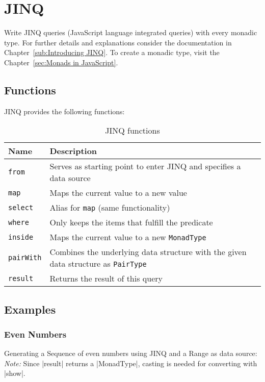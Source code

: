 \section{JINQ} %
\label{sec:API_JINQ}
Write JINQ queries (JavaScript language integrated queries) with every monadic type.
\newline
For further details and explanations consider the documentation in
Chapter~\ref{sub:Introducing JINQ}.
\newline
To create a monadic type, visit the Chapter~\ref{sec:Monads in JavaScript}.


\subsection{Functions}
\label{sub:JINQ_Functions}
JINQ provides the following functions:

\begin{table}[H]
  \centering
  \begin{tabularx}{\textwidth}{| l | X |} \hline
    \textbf{Name}       & \textbf{Description} \\ \hline
    \texttt{from}       & Serves as starting point to enter JINQ and specifies a data source \\ \hline 
    \texttt{map}        & Maps the current value to a new value \\ \hline 
    \texttt{select}     & Alias for \texttt{map} (same functionality) \\ \hline 
    \texttt{where}      & Only keeps the items that fulfill the predicate \\ \hline 
    \texttt{inside}     & Maps the current value to a new \texttt{MonadType} \\ \hline 
    \texttt{pairWith}   & Combines the underlying data structure with the given data structure as \texttt{PairType} \\ \hline 
    \texttt{result}     & Returns the result of this query\\ \hline 

  \end{tabularx}
  \caption{JINQ functions}
  \label{tab:jinq_functions}
\end{table}

\subsection{Examples}
\label{sub:JINQ_Examples}

\subsubsection{Even Numbers}
\label{subsub:JINQ_Even Numbers}
Generating a Sequence of even numbers using JINQ and a Range as data source:
\newline
\textit{Note:} Since |result| returns a |MonadType|, casting is needed
for converting with |show|.

